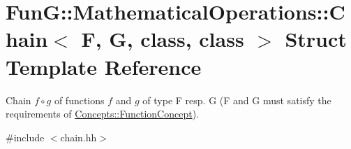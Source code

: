 \hypertarget{structFunG_1_1MathematicalOperations_1_1Chain}{\section{\-Fun\-G\-:\-:\-Mathematical\-Operations\-:\-:\-Chain$<$ \-F, \-G, class, class $>$ \-Struct \-Template \-Reference}
\label{structFunG_1_1MathematicalOperations_1_1Chain}
}


\-Chain $ f\circ g $ of functions $f$ and $g$ of type \-F resp. \-G (\-F and \-G must satisfy the requirements of \hyperlink{structFunG_1_1Concepts_1_1FunctionConcept}{\-Concepts\-::\-Function\-Concept}).  




{\ttfamily \#include $<$chain.\-hh$>$}

